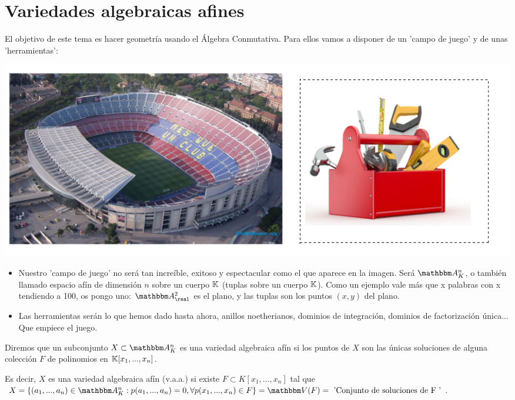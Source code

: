 \chapter{Variedades algebraicas afines}
El objetivo de este tema es hacer geometría usando el Álgebra Conmutativa. Para ellos vamos a disponer de un 'campo de juego' y de unas 'herramientas':

\begin{center}
	\includegraphics[scale=0.45]{img/vaa.png}
\end{center}

\begin{itemize}
	\item Nuestro 'campo de juego' no será tan increíble, exitoso y espectacular como el que aparece en la imagen. Será $\A^n_K$, o también llamado espacio afín de dimensión $n$ sobre un cuerpo $\mathbb{K}$ (tuplas sobre un cuerpo $\mathbb{K}$). Como un ejemplo vale más que x palabras con x tendiendo a 100, os pongo uno: $\A^2_{\real}$ es el plano, y las tuplas son los puntos $(x,y)$ del plano.
	\item Las herramientas serán lo que hemos dado hasta ahora, anillos noetherianos, dominios de integración, dominios de factorización única... Que empiece el juego.
\end{itemize}

\begin{defn}\label{def:variedad_algebraica}
	Diremos que un subconjunto $X\subset \A^n_K$ es una variedad algebraica afín si los puntos de $X$ son las únicas soluciones de alguna colección $F$ de polinomios en $\mathbb{K}[x_1,...,x_n]$.

	Es decir, $X$ es una variedad algebraica afín (v.a.a.) si existe $F \subset K[x_1,...,x_n]$ tal que $X=\{ (a_1,...,a_n) \in \A_K^n: p(a_1,...,a_n)=0,  \forall p(x_1,...,x_n) \in F \} = \V(F)=\text{ 'Conjunto de soluciones de F '}$.
\end{defn}

